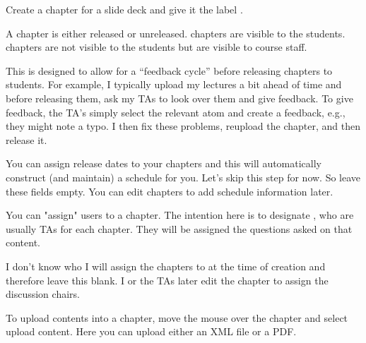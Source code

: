 \begin{exercise}
Create a chapter for a slide deck and give it the label
.
\end{exercise}


\begin{gram}
A chapter is either released or unreleased. 
%
 chapters are visible to the students.
%
 chapters are not visible to the students but  are visible to course staff.  

This is designed to allow for a ``feedback cycle'' before releasing chapters to students.  
%
For example, I typically  upload my lectures a bit ahead of time and before releasing them, ask my TAs to look over them and give feedback.
%
To give feedback, the TA's simply select the relevant atom and create a feedback, e.g., they might note a typo.
%
I then fix these problems, reupload the chapter, and then release it.  
\end{gram}

\begin{gram}  
You can assign release dates to your chapters and this will
automatically construct (and maintain) a schedule for you.  Let's skip
this step for now.  So leave these fields empty.  You can edit
chapters to add schedule information later.
\end{gram}


\begin{gram}
You can "assign" users to a chapter.  The intention here is to
designate , who are usually TAs for each
chapter. 
%
They will be assigned the questions asked on that content.

I don't know who I will assign the chapters to at the time of creation and therefore leave this blank.  I or the TAs later edit the chapter to assign the discussion chairs. 
\end{gram}

\begin{gram}
\label{guide:chapter::upload::window}
To upload contents into a chapter, move the mouse over the chapter and
select upload content.  Here you can upload either an XML
file or a PDF.  
\end{gram}

